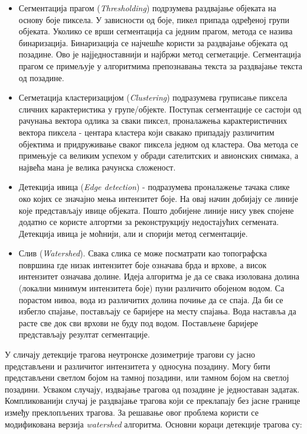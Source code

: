 \documentclass[12pt,a4paper,serbian,oneside]{book}
\begin{document}
\begin{itemize}

  \item Сегментација прагом (\textit{Thresholding}) подрзумева раздвајање објеката на основу боје пиксела. У зависности од боје, пикел припада одређеној групи објеката. Уколико се врши сегментација са једним прагом, метода се назива бинаризација. Бинаризација се најчешће користи за раздвајање објеката од позадине. Ово је најједноставнији и најбржи метод сегметације. Сегментација прагом се примељује у алгоритмима препознавања текста за раздвајање текста од позадине.

  \item Сегметација кластеризацијом (\textit{Clustering}) подразумева груписање пиксела сличних карактеристика у групе/објекте. Поступак сегментације се састоји од рачунања вектора одлика за сваки пиксел, проналажења карактеристичних вектора пиксела - центара кластера који свакако припадају различитим објектима и придруживање сваког пиксела једном од кластера. Ова метода се примењује са великим успехом у обради сателитских и авионских снимака, а највећа мана је велика рачунска сложеност.
  
  \item Детекција ивица (\textit{Edge detection}) - подразумева проналажење тачака слике око којих се значајно мења интензитет боје. На овај начин добијају се линије које представљају ивице објеката. Пошто добијене линије нису увек спојене додатно се користе алгортми за реконструкцију недостајућих сегмената. Детекција ивица је моћнији, али и спорији метод сегментације.
  
  \item Слив (\textit{Watershed}). Свака слика се може посматрати као топографска површина где низак интензитет боје означава брда и врхове, а висок интензитет означава долине. Идеја алгоритма је да се свака изолована долина  (локални минимум интензитета боје) пуни различито обојеном водом. Са порастом нивоа, вода из различитих долина почиње да се спаја. Да би се избегло спајање, постављају се баријере на месту спајања.  Вода наставља да расте све док сви врхови не буду под водом. Постављене баријере представљају резултат сегментације.

\end{itemize}
 
У сличају детекције трагова неутронске дозиметрије трагови су јасно представљени и различитог интензитета у односуна позадину. Могу бити представљени светлом бојом на тамној позадини, или тамном бојом на светлој позадини. Усваком случају, издвајање трагова од позадине је једноставан задатак. Компликованији случај је раздвајање трагова који се преклапају без јасне границе између преклопљених трагова. За решавање овог проблема користи се модификована верзија \textit{watershed} алгоритма. Основни кораци детекције трагова су:
\end{document}
